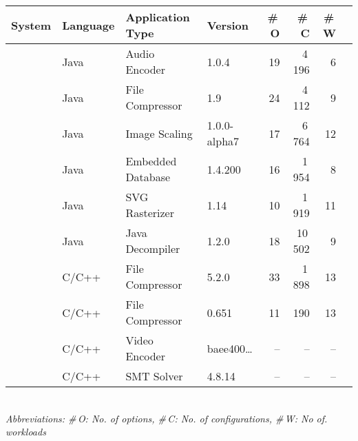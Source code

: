 \begin{tabular}{p{0.8cm}lp{2.0cm}lrrrr}
		\toprule
		\textbf{System} & \textbf{Language} & \textbf{Application Type} & \textbf{Version} & \textbf{\#\,O} & \textbf{\#\,C} & \textbf{\#\,W}  \\
		\midrule
		\jumper & Java & Audio Encoder & 1.0.4 & 19 & 4\,196 & 6   \\
		
		\kanzi &Java  & File Compressor & 1.9 & 24 & 4\,112 & 9 \\
			
		\dconvert & Java & Image Scaling & 1.0.0-alpha7 & 17 & 6\,764 & 12  \\
				
		\htwo & Java & Embedded Database & 1.4.200 & 16 & 1\,954  & 8  \\
		
		\batik & Java & SVG Rasterizer & 1.14 & 10 & 1\,919 &  11  \\
		
		\jadx & Java & Java Decompiler & 1.2.0 & 18 & 10\,502 & 9  \\
		
		\midrule
		
		 \xz & C/C++ & File Compressor & 5.2.0 & 33 & 1\,898 & 13  \\
		\lrzip & C/C++ & File Compressor & 0.651 & 11 & 190 & 13  \\
		\midrule
		\rowcolor{green!70!black}\xzwo & C/C++ & Video Encoder & baee400\ldots & -- & -- & --  \\
		\rowcolor{green!70!black}\zdrei & C/C++ & SMT Solver & 4.8.14 & -- & -- & --  \\
\bottomrule

\end{tabular}\\
{\vspace{1mm}\textit{Abbreviations: \#\,O: No. of options, \#\,C: No. of configurations, \#\,W: No of. workloads}}
